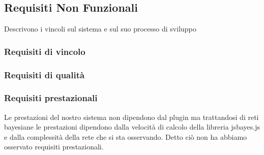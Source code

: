         
        \subsection{Requisiti Non Funzionali}
        Descrivono i vincoli sul sistema e sul suo processo di sviluppo
        \subsubsection{Requisiti di vincolo}
        
        \subsubsection{Requisiti di qualità}
        \subsubsection{Requisiti prestazionali}
        Le prestazioni del nostro sistema non dipendono dal plugin ma trattandosi di reti bayesiane le prestazioni dipendono dalla velocità di calcolo della libreria jsbayes.js e dalla complessità della rete che si sta osservando. Detto ciò non ha abbiamo osservato requisiti prestazionali.

